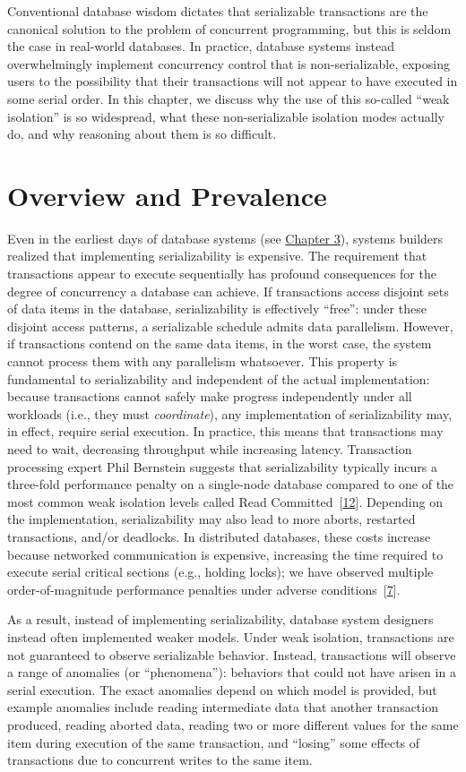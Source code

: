 \documentclass[b5paper,11pt,twoside,openright]{book}
\newcommand\Section[2]{
  \hypertarget{#1}{
    \section{#2}
  }
}
\begin{document}
Conventional database wisdom dictates that serializable transactions are
the canonical solution to the problem of concurrent programming, but
this is seldom the case in real-world databases. In practice, database
systems instead overwhelmingly implement concurrency control that is
non-serializable, exposing users to the possibility that their
transactions will not appear to have executed in some serial order. In
this chapter, we discuss why the use of this so-called ``weak
isolation'' is so widespread, what these non-serializable isolation
modes actually do, and why reasoning about them is so difficult.

\Section{overview-and-prevalence}{%
Overview and Prevalence
}

Even in the earliest days of database systems (see
\hyperref[ch3-techniques]{Chapter 3}), systems builders realized that
implementing serializability is expensive. The requirement that
transactions appear to execute sequentially has profound consequences
for the degree of concurrency a database can achieve. If transactions
access disjoint sets of data items in the database, serializability is
effectively ``free'': under these disjoint access patterns, a
serializable schedule admits data parallelism. However, if transactions
contend on the same data items, in the worst case, the system cannot
process them with any parallelism whatsoever. This property is
fundamental to serializability and independent of the actual
implementation: because transactions cannot safely make progress
independently under all workloads (i.e., they must \emph{coordinate}),
any implementation of serializability may, in effect, require serial
execution. In practice, this means that transactions may need to wait,
decreasing throughput while increasing latency. Transaction processing
expert Phil Bernstein suggests that serializability typically incurs a
three-fold performance penalty on a single-node database compared to one
of the most common weak isolation levels called Read
Committed~{{[}\protect\hyperlink{ref-bernstein-tutorial}{12}{]}}.
Depending on the implementation, serializability may also lead to more
aborts, restarted transactions, and/or deadlocks. In distributed
databases, these costs increase because networked communication is
expensive, increasing the time required to execute serial critical
sections (e.g., holding locks); we have observed multiple
order-of-magnitude performance penalties under adverse
conditions~{{[}\protect\hyperlink{ref-coord-avoid}{7}{]}}.

As a result, instead of implementing serializability, database system
designers instead often implemented weaker models. Under weak isolation,
transactions are not guaranteed to observe serializable behavior.
Instead, transactions will observe a range of anomalies (or
``phenomena''): behaviors that could not have arisen in a serial
execution. The exact anomalies depend on which model is provided, but
example anomalies include reading intermediate data that another
transaction produced, reading aborted data, reading two or more
different values for the same item during execution of the same
transaction, and ``losing'' some effects of transactions due to
concurrent writes to the same item.
\end{document}
